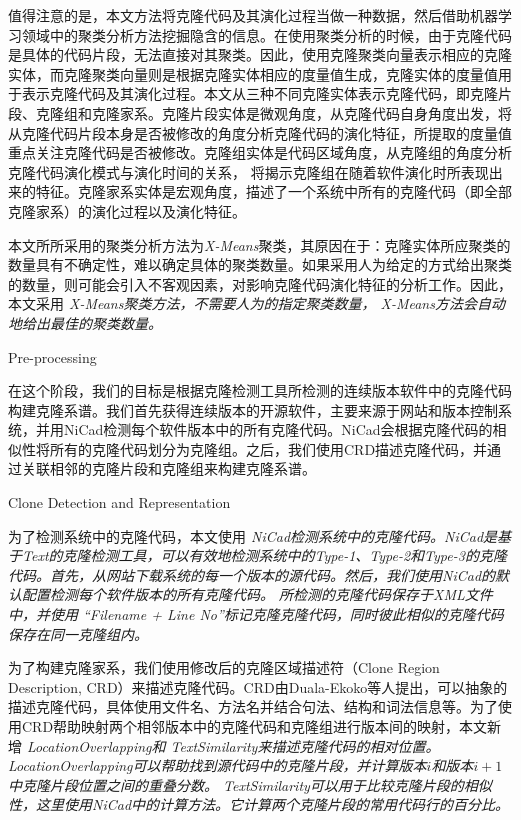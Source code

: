 值得注意的是，本文方法将克隆代码及其演化过程当做一种数据，然后借助机器学习领域中的聚类分析方法挖掘隐含的信息。在使用聚类分析的时候，由于克隆代码是具体的代码片段，无法直接对其聚类。因此，使用克隆聚类向量表示相应的克隆实体，而克隆聚类向量则是根据克隆实体相应的度量值生成，克隆实体的度量值用于表示克隆代码及其演化过程。本文从三种不同克隆实体表示克隆代码，即克隆片段、克隆组和克隆家系。克隆片段实体是微观角度，从克隆代码自身角度出发，将从克隆代码片段本身是否被修改的角度分析克隆代码的演化特征，所提取的度量值重点关注克隆代码是否被修改。克隆组实体是代码区域角度，从克隆组的角度分析克隆代码演化模式与演化时间的关系， 将揭示克隆组在随着软件演化时所表现出来的特征。克隆家系实体是宏观角度，描述了一个系统中所有的克隆代码（即全部克隆家系）的演化过程以及演化特征。

本文所所采用的聚类分析方法为{\em X-Means}\cite{pelleg2000x}聚类，其原因在于：克隆实体所应聚类的数量具有不确定性，难以确定具体的聚类数量。如果采用人为给定的方式给出聚类的数量，则可能会引入不客观因素，对影响克隆代码演化特征的分析工作。因此，本文采用\em{ X-Means}聚类方法，不需要人为的指定聚类数量，\em{ X-Means}方法会自动地给出最佳的聚类数量。

{ Pre-processing}

在这个阶段，我们的目标是根据克隆检测工具所检测的连续版本软件中的克隆代码构建克隆系谱。我们首先获得连续版本的开源软件，主要来源于网站和版本控制系统，并用NiCad检测每个软件版本中的所有克隆代码。NiCad会根据克隆代码的相似性将所有的克隆代码划分为克隆组。之后，我们使用CRD描述克隆代码，并通过关联相邻的克隆片段和克隆组来构建克隆系谱。

{Clone Detection and Representation}


为了检测系统中的克隆代码，本文使用\em{ NiCad}\cite{roy2008nicad}检测系统中的克隆代码。NiCad是基于Text的克隆检测工具，可以有效地检测系统中的Type-1、Type-2和Type-3的克隆代码。首先，从网站下载系统的每一个版本的源代码。然后，我们使用NiCad的默认配置检测每个软件版本的所有克隆代码。
所检测的克隆代码保存于XML文件中，并使用\em{ ``Filename + Line No''}标记克隆克隆代码，同时彼此相似的克隆代码保存在同一克隆组内。

为了构建克隆家系，我们使用修改后的克隆区域描述符（Clone Region Description, CRD）来描述克隆代码。CRD由Duala-Ekoko等人提出，可以抽象的描述克隆代码，具体使用文件名、方法名并结合句法、结构和词法信息等\cite{duala2010clone}。为了使用CRD帮助映射两个相邻版本中的克隆代码和克隆组进行版本间的映射，本文新增\em{ LocationOverlapping}和\em{ TextSimilarity}来描述克隆代码的相对位置\cite{}。\em{ LocationOverlapping}可以帮助找到源代码中的克隆片段\cite{kim2005empirical}，并计算版本$ i $和版本$ i + 1 $中克隆片段位置之间的重叠分数。\em{ TextSimilarity}可以用于比较克隆片段的相似性，这里使用NiCad中的计算方法。它计算两个克隆片段的常用代码行的百分比。

